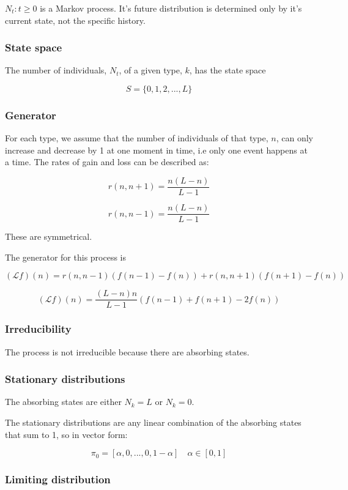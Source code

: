 \documentclass{article}
\begin{document}
$N_t : t \geq 0$ is a Markov process. It's future distribution is determined only by it's current state, not the specific history.

\subsubsection{State space}

The number of individuals, $N_t$, of a given type, $k$, has the state space

$$S = \{0,1,2,...,L\}$$

\subsubsection{Generator}

For each type, we assume that the number of individuals of that type, $n$, can only increase and decrease by 1 at one moment in time, i.e only one event happens at a time. The rates of gain and loss can be described as:

$$r(n,n+1) = \frac{n(L-n)}{L-1}$$

$$r(n,n-1) = \frac{n(L-n)}{L-1}$$

These are symmetrical. 

The generator for this process is 

$$(\mathcal{L}f)(n) = r(n,n-1)(f(n-1)-f(n)) + r(n,n+1)(f(n+1)-f(n))$$

$$(\mathcal{L}f)(n) = \frac{(L-n)n}{L-1}(f(n-1) + f(n+1) - 2f(n))$$

\subsubsection{Irreducibility}

The process is not irreducible because there are absorbing states. 

\subsubsection{Stationary distributions}

The absorbing states are either $N_k = L$ or $N_k=0$.

The stationary distributions are any linear combination of the absorbing states that sum to 1, so in vector form:

$$\pi_0 = [\alpha,0,...,0,1-\alpha] \quad \alpha \in [0,1]$$


\subsubsection{Limiting distribution}
\end{document}
